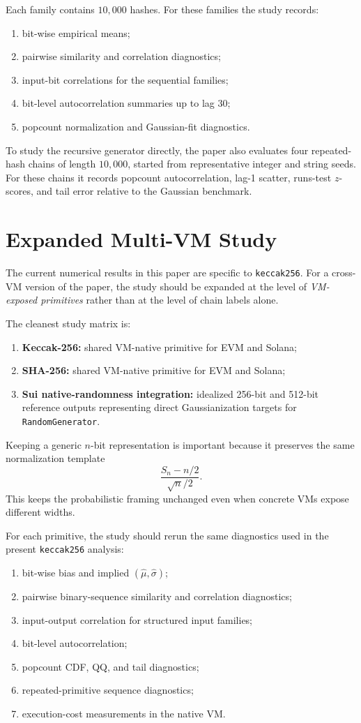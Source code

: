 \documentclass[11pt]{article}
\begin{document}
Each family contains $10{,}000$ hashes. For these families the study records:
\begin{enumerate}
\item bit-wise empirical means;
\item pairwise similarity and correlation diagnostics;
\item input-bit correlations for the sequential families;
\item bit-level autocorrelation summaries up to lag $30$;
\item popcount normalization and Gaussian-fit diagnostics.
\end{enumerate}

To study the recursive generator directly, the paper also evaluates four
repeated-hash chains of length $10{,}000$, started from representative integer
and string seeds. For these chains it records popcount autocorrelation, lag-1
scatter, runs-test $z$-scores, and tail error relative to the Gaussian
benchmark.

\section{Expanded Multi-VM Study}

The current numerical results in this paper are specific to
\texttt{keccak256}. For a cross-VM version of the paper, the study should be
expanded at the level of \emph{VM-exposed primitives} rather than at the level
of chain labels alone.

The cleanest study matrix is:
\begin{enumerate}
\item \textbf{Keccak-256:} shared VM-native primitive for EVM and Solana;
\item \textbf{SHA-256:} shared VM-native primitive for EVM and Solana;
\item \textbf{Sui native-randomness integration:} idealized 256-bit and
512-bit reference outputs representing direct Gaussianization targets for
\texttt{RandomGenerator}.
\end{enumerate}

Keeping a generic $n$-bit representation is important because it preserves the
same normalization template
\[
\frac{S_n-n/2}{\sqrt{n}/2}.
\]
This keeps the probabilistic framing unchanged even when concrete VMs expose
different widths.

For each primitive, the study should rerun the same diagnostics used in the
present \texttt{keccak256} analysis:
\begin{enumerate}
\item bit-wise bias and implied $(\hat\mu, \hat\sigma)$;
\item pairwise binary-sequence similarity and correlation diagnostics;
\item input-output correlation for structured input families;
\item bit-level autocorrelation;
\item popcount CDF, QQ, and tail diagnostics;
\item repeated-primitive sequence diagnostics;
\item execution-cost measurements in the native VM.
\end{enumerate}
\end{document}
